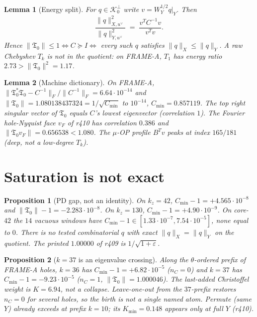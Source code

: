 \documentclass[11pt]{article}
\newtheorem{lemma}{Lemma}
\newtheorem{prop}{Proposition}
\theoremstyle{remark}
\newcommand{\Tfrak}{\mathfrak{T}}
\begin{document}
\begin{lemma}[Energy split]\label{lem:split}
For $q\in\mathcal{K}_0^\perp$ write
$v=W_Y^{1/2}q|_Y$.
Then
\[
  \frac{\|q\|_{X,u^\vee}^2}{\|q\|_{Y,u^\vee}^2}
  \;=\;
  \frac{v^T C^{-1}v}{v^T v}.
\]
Hence
$\|\Tfrak_0\|\le 1\iff C\succeq I\iff$ every such $q$
satisfies $\|q\|_X\le\|q\|_Y$.
A raw Chebyshev $T_k$ is not in the quotient:
on FRAME-A, $T_1$ has energy ratio $2.73>\|\Tfrak_0\|^2=1.17$.
\end{lemma}

\begin{lemma}[Machine dictionary]\label{lem:machine}
On FRAME-A,
$\|\Tfrak_0^*\Tfrak_0-C^{-1}\|_F/\|C^{-1}\|_F=6.64\cdot 10^{-14}$
and $\|\Tfrak_0\|=1.080138437324=1/\sqrt{C_{\min}}$
to $10^{-14}$, $C_{\min}=0.857119$.
The top right singular vector of $\Tfrak_0$ equals $C$'s
lowest eigenvector (correlation $1$).
The Fourier hole-Nyquist face $v_F$ of r410 has
correlation $0.386$ and $\|\Tfrak_0 v_F\|=0.656538<1.080$.
The $\mu$-OP profile $B^T v$ peaks at index $165/181$
(deep, not a low-degree $T_k$).
\end{lemma}

\section{Saturation is not exact}

\begin{prop}[PD gap, not an identity]\label{prop:sat}
On $k_z=42$, $C_{\min}-1=+4.565\cdot 10^{-8}$ and
$\|\Tfrak_0\|-1=-2.283\cdot 10^{-8}$.
On $k_z=130$, $C_{\min}-1=+4.90\cdot 10^{-9}$.
On core-$42$ the $14$ vacuous windows have
$C_{\min}-1\in[1.33\cdot 10^{-7},7.54\cdot 10^{-5}]$,
none equal to $0$.
There is no tested combinatorial $q$ with exact
$\|q\|_X=\|q\|_Y$ on the quotient.
The printed $1.00000$ of r409 is $1/\sqrt{1+\varepsilon}$.
\end{prop}

\begin{prop}[$k=37$ is an eigenvalue crossing]\label{prop:k37}
Along the $\theta$-ordered prefix of FRAME-A holes,
$k=36$ has $C_{\min}-1=+6.82\cdot 10^{-5}$ ($n_C=0$) and
$k=37$ has $C_{\min}-1=-9.23\cdot 10^{-5}$ ($n_C=1$,
$\|\Tfrak_0\|=1.000046$).
The last-added Christoffel weight is $K=6.94$, not a
collapse.
Leave-one-out from the $37$-prefix restores $n_C=0$ for
several holes, so the birth is not a single named atom.
Permute (same $Y$) already exceeds at prefix $k=10$;
its $K_{\min}=0.148$ appears only at full $Y$ (r410).
\end{prop}
\end{document}
